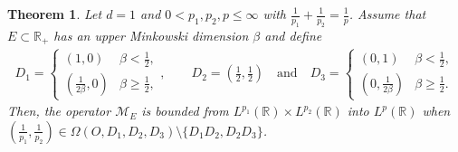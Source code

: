 \documentclass[a4paper,reqno]{amsart}
\newtheorem{theorem}[thm]{Theorem}
\numberwithin{equation}{section}
\newcommand{\R}{{\mathbb {R}}}
\begin{document}
	\begin{theorem}\label{main2}
		Let $d=1$ and $0<p_1,p_2,p\leq\infty$ with $\frac{1}{p_1}+\frac{1}{p_2}=\frac{1}{p}$. Assume that $E\subset\R_+$ has an upper Minkowski dimension $\beta$ and define
		\begin{align*}
			D_1=\begin{cases} 
				\left(1,0\right) & \beta<\frac{1}{2}, \\
				\left(\frac{1}{2\beta},0\right) & \beta\geq \frac{1}{2}, 
			\end{cases},\qquad D_2= \left(\frac{1}{2},\frac{1}{2}\right)\quad\text{and}\quad D_3= \begin{cases} 
				\left(0,1\right) & \beta<\frac{1}{2}, \\
				\left(0,\frac{1}{2\beta}\right) & \beta\geq \frac{1}{2}.
			\end{cases}
		\end{align*}        
		Then, the operator $\mathcal{M}_E$ is bounded from $L^{p_1}(\mathbb{R})\times L^{p_2}(\mathbb{R})$ into $L^{p}(\mathbb{R})$ when $(\frac{1}{p_1},\frac{1}{p_2})\in \Omega(O,D_1,D_2,D_3)\setminus \{D_1D_2, D_2D_3\}$.
	\end{theorem}
\end{document}

